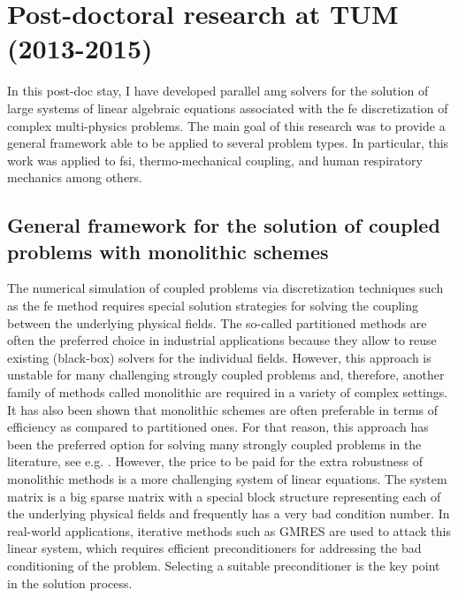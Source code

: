 \documentclass{article}
\newcommand{\bemph}[1]{#1}
\begin{document}
\section{Post-doctoral research at TUM (2013-2015)} \label{sec:tum}

In this post-doc stay, \bemph{I have developed parallel \ac{amg} solvers for the solution of large systems of linear algebraic equations associated with the \ac{fe} discretization of complex multi-physics problems}.  The main goal of this research was to provide a general framework able to be applied to several problem types. In particular, this work was applied to \ac{fsi}, thermo-mechanical coupling, and human respiratory mechanics among others.

\subsection{General framework for the solution of coupled problems with monolithic schemes}

The numerical simulation of coupled problems via discretization techniques such as the \ac{fe} method requires special solution strategies for solving the coupling between
the underlying physical fields. The so-called partitioned methods \cite{Felippa2001} are often the preferred choice in industrial applications because they allow to reuse existing (black-box) solvers for the individual fields. However, this approach is unstable for many challenging strongly coupled problems \cite{Causin2005,Forster2007} and, therefore, another family of methods called monolithic are required in a variety of complex settings. It has also been shown that monolithic schemes are often preferable in terms of efficiency as compared to partitioned ones. For that reason, this approach has been the preferred option for solving many strongly coupled problems in the literature, see e.g. \cite{Badia2008,badia_block_2014}. However, the price to be paid for the extra robustness of monolithic methods is a more challenging system of linear equations. The system matrix is a big sparse matrix with a special block structure representing each of the underlying physical fields and frequently has a very bad condition number. In real-world applications, iterative methods such as GMRES \cite{saad_iterative_2003} are used to attack this linear system, which requires efficient preconditioners for addressing the bad conditioning of the problem. Selecting a suitable preconditioner is the key point in the solution process.
\end{document}

